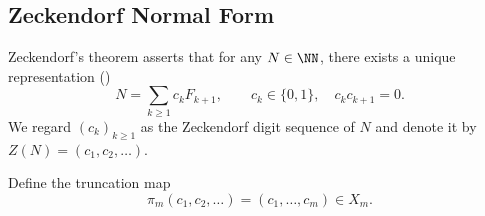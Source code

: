 \subsection{Zeckendorf Normal Form}\label{subsec:folding-zeckendorf-canonical}

Zeckendorf's theorem asserts that for any $N\in\NN$, there exists a unique representation (\cite{Zeckendorf1972})
\[
N=\sum_{k\ge1}c_k F_{k+1},\qquad c_k\in\{0,1\},\quad c_kc_{k+1}=0.
\]
We regard $(c_k)_{k\ge1}$ as the Zeckendorf digit sequence of $N$ and denote it by $Z(N)=(c_1,c_2,\dots)$.

Define the truncation map
\[
\pi_m(c_1,c_2,\dots)=(c_1,\dots,c_m)\in X_m.
\]
